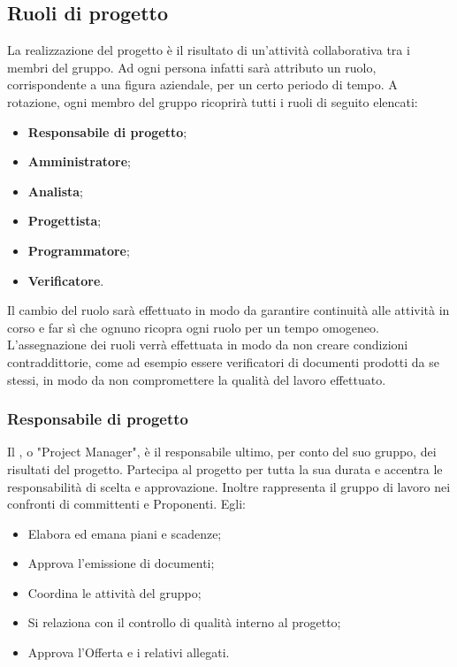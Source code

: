 \documentclass[NormeDiProgetto.tex]{subfiles}
\begin{document}
	\subsection{Ruoli di progetto}
	La realizzazione del progetto è il risultato di un'attività collaborativa tra i membri del gruppo. Ad ogni persona infatti sarà attributo un ruolo, corrispondente a una figura aziendale, per un certo periodo di tempo. A rotazione, ogni membro del gruppo ricoprirà tutti i ruoli di seguito elencati:
	\begin{itemize}
		\item \textbf{Responsabile di progetto};
		\item \textbf{Amministratore};
		\item \textbf{Analista};
		\item \textbf{Progettista};
		\item \textbf{Programmatore};
		\item \textbf{Verificatore}.
	\end{itemize}
	Il cambio del ruolo sarà effettuato in modo da garantire continuità alle attività in corso e far sì che ognuno ricopra ogni ruolo per un tempo omogeneo.\\ L'assegnazione dei ruoli verrà effettuata \respdiprog  in modo da non creare condizioni contraddittorie, come ad esempio essere verificatori di documenti prodotti da se stessi, in modo da non compromettere la qualità del lavoro effettuato.
	\subsubsection{Responsabile di progetto}
	Il \respdiprog, o "Project Manager", è il responsabile ultimo, per conto del suo gruppo, dei risultati del progetto. Partecipa al progetto per tutta la sua durata e accentra le responsabilità di scelta e approvazione. Inoltre rappresenta il gruppo di lavoro nei confronti di committenti e Proponenti. Egli:
	\begin{itemize}
		\item Elabora ed emana piani e scadenze;
		\item Approva l'emissione di documenti;
		\item Coordina le attività del gruppo;
		\item Si relaziona con il controllo di qualità interno al progetto;
		\item Approva l'Offerta e i relativi allegati.
	\end{itemize}
\end{document}
